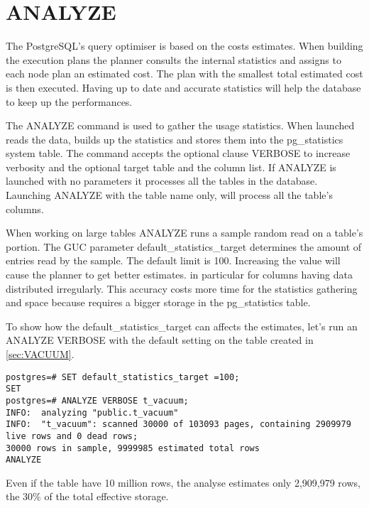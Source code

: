 \section{ANALYZE}
\label{sec:ANALYZE}
The PostgreSQL's query optimiser is based on the costs estimates. When building the execution plans 
the planner consults the internal statistics and assigns to each node plan an estimated cost. The 
plan with the smallest total estimated cost is then executed. Having up to date and 
accurate statistics will help the database to keep up the performances.\newline

The ANALYZE command is used to gather the usage statistics. When launched reads the 
data, builds up the statistics and stores them into the pg\_statistics system table. The command accepts the optional clause VERBOSE to increase verbosity and the 
optional target table and the column list. If ANALYZE is launched with no parameters it 
processes all the tables in the database. Launching ANALYZE with the table name only, will process 
all the table's columns.\newline

When working on large tables ANALYZE runs a sample random read on a table's portion.  The GUC 
parameter default\_statistics\_target determines the amount of entries read by the sample. The 
default limit is 100. Increasing the value will cause the planner to get better estimates. in 
particular for columns having data distributed irregularly. This accuracy costs more time for the 
statistics gathering and space because requires a bigger storage in the pg\_statistics 
table.\newline


To show how the default\_statistics\_target can affects the estimates, let's run an ANALYZE VERBOSE 
with the default setting on the table created in \ref{sec:VACUUM}.

\begin{lstlisting}[style=pgsql]
postgres=# SET default_statistics_target =100;
SET
postgres=# ANALYZE VERBOSE t_vacuum;
INFO:  analyzing "public.t_vacuum"
INFO:  "t_vacuum": scanned 30000 of 103093 pages, containing 2909979 live rows and 0 dead rows; 
30000 rows in sample, 9999985 estimated total rows
ANALYZE
\end{lstlisting}

Even if the table have 10 million rows, the analyse estimates only 2,909,979 rows, the 30\% of the 
total effective storage.

